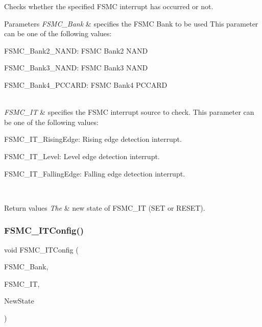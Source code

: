 Checks whether the specified F\+S\+MC interrupt has occurred or not. 


\begin{DoxyParams}{Parameters}
{\em F\+S\+M\+C\+\_\+\+Bank} & specifies the F\+S\+MC Bank to be used This parameter can be one of the following values\+: \begin{DoxyItemize}
\item F\+S\+M\+C\+\_\+\+Bank2\+\_\+\+N\+A\+ND\+: F\+S\+MC Bank2 N\+A\+ND \item F\+S\+M\+C\+\_\+\+Bank3\+\_\+\+N\+A\+ND\+: F\+S\+MC Bank3 N\+A\+ND \item F\+S\+M\+C\+\_\+\+Bank4\+\_\+\+P\+C\+C\+A\+RD\+: F\+S\+MC Bank4 P\+C\+C\+A\+RD \end{DoxyItemize}
\\
\hline
{\em F\+S\+M\+C\+\_\+\+IT} & specifies the F\+S\+MC interrupt source to check. This parameter can be one of the following values\+: \begin{DoxyItemize}
\item F\+S\+M\+C\+\_\+\+I\+T\+\_\+\+Rising\+Edge\+: Rising edge detection interrupt. \item F\+S\+M\+C\+\_\+\+I\+T\+\_\+\+Level\+: Level edge detection interrupt. \item F\+S\+M\+C\+\_\+\+I\+T\+\_\+\+Falling\+Edge\+: Falling edge detection interrupt. \end{DoxyItemize}
\\
\hline
\end{DoxyParams}

\begin{DoxyRetVals}{Return values}
{\em The} & new state of F\+S\+M\+C\+\_\+\+IT (S\+ET or R\+E\+S\+ET). \\
\hline
\end{DoxyRetVals}
\mbox{\label{group___f_s_m_c___private___functions_ga217027ae3cd213b9076b6a1be197064c}} 
\subsubsection{\texorpdfstring{FSMC\_ITConfig()}{FSMC\_ITConfig()}}
{\footnotesize\ttfamily void F\+S\+M\+C\+\_\+\+I\+T\+Config (\begin{DoxyParamCaption}\item[{uint32\+\_\+t}]{F\+S\+M\+C\+\_\+\+Bank,  }\item[{uint32\+\_\+t}]{F\+S\+M\+C\+\_\+\+IT,  }\item[{\mbox{\hyperlink{group___exported__types_gac9a7e9a35d2513ec15c3b537aaa4fba1}{Functional\+State}}}]{New\+State }\end{DoxyParamCaption})}



